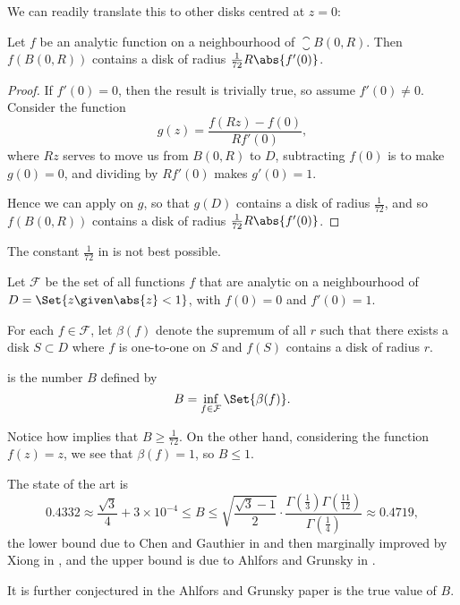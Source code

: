 We can readily translate this to other disks centred at $z = 0$:

\begin{corollary}\label{cor9.5}
	Let $f$ be an analytic function on a neighbourhood of $\closure{B(0, R)}$.
	Then $f(B(0, R))$ contains a disk of radius $\frac{1}{72} R \abs{f'(0)}$.
\end{corollary}

\begin{proof}
	If $f'(0) = 0$, then the result is trivially true, so assume $f'(0) \neq 0$.
	Consider the function
	\[
		g(z) = \frac{f(R z) - f(0)}{R f'(0)},
	\]
	where $R z$ serves to move us from $B(0, R)$ to $D$, subtracting $f(0)$ is to make $g(0) = 0$, and dividing by $R f'(0)$ makes $g'(0) = 1$.

	Hence we can apply  on $g$, so that $g(D)$ contains a disk of radius $\frac{1}{72}$, and so $f(B(0, R))$ contains a disk of radius $\frac{1}{72} R \abs{f'(0)}$.
\end{proof}

The constant $\frac{1}{72}$ in  is not best possible.

\begin{definition}
	Let $\mathcal{F}$ be the set of all functions $f$ that are analytic on a neighbourhood of $D = \Set{z \given \abs{z} < 1}$, with $f(0) = 0$ and $f'(0) = 1$.

	For each $f \in \mathcal{F}$, let $\beta(f)$ denote the supremum of all $r$ such that there exists a disk $S \subset D$ where $f$ is one-to-one on $S$ and $f(S)$ contains a disk of radius $r$.

	 is the number $B$ defined by
	\[
		B = \inf_{f \in \mathcal{F}} \Set{\beta(f)}.
	\]
\end{definition}

\begin{remark}
	Notice how implies that $B \geq \frac{1}{72}$.
	On the other hand, considering the function $f(z) = z$, we see that $\beta(f) = 1$, so $B \leq 1$.

	The state of the art is
	\[
		0.4332\approx\frac{\sqrt{3}}{4}+3\times10^{-4}\leq B\leq \sqrt{\frac{\sqrt{3}-1}{2}} \cdot \frac{\Gamma(\frac{1}{3})\Gamma(\frac{11}{12})}{\Gamma(\frac{1}{4})}\approx 0.4719,
	\]
	the lower bound due to Chen and Gauthier in \cite{Chen1996} and then marginally improved by Xiong in \cite{Xiong1998}, and the upper bound is due to Ahlfors and Grunsky in \cite{Ahlfors1937}.

	It is further conjectured in the Ahlfors and Grunsky paper is the true value of $B$.
\end{remark}

